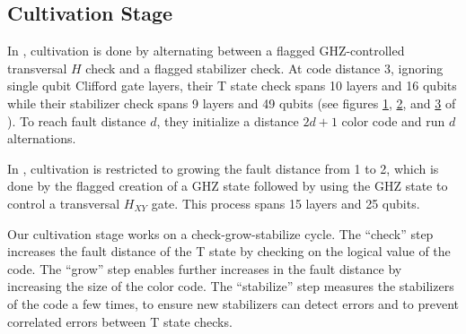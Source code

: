 \documentclass[onecolumn,unpublished,a4paper]{quantumarticle}
\theoremstyle{definition}
\begin{document}
\subsection{Cultivation Stage}

In \cite{chamberland2020colorinjection}, cultivation is done by alternating between a flagged GHZ-controlled transversal $H$ check and a flagged stabilizer check.
At code distance 3, ignoring single qubit Clifford gate layers, their T state check spans 10 layers and 16 qubits while their stabilizer check spans 9 layers and 49 qubits (see figures
\href{
    https://www.nature.com/articles/s41534-020-00319-5/figures/1
}{1},
\href{
    https://www.nature.com/articles/s41534-020-00319-5/figures/2
}{2},
and
\href{
    https://www.nature.com/articles/s41534-020-00319-5/figures/3
}{3}
of \cite{chamberland2020colorinjection}).
To reach fault distance $d$, they initialize a distance $2d+1$ color code and run $d$ alternations.

In \cite{itogawa2024zeroleveldistilldistill}, cultivation is restricted to growing the fault distance from 1 to 2, which is done by the flagged creation of a GHZ state followed by using the GHZ state to control a transversal $H_{XY}$ gate.
This process spans 15 layers and 25 qubits.

Our cultivation stage works on a check-grow-stabilize cycle.
The ``check'' step increases the fault distance of the T state by checking on the logical value of the code.
The ``grow'' step enables further increases in the fault distance by increasing the size of the color code.
The ``stabilize'' step measures the stabilizers of the code a few times, to ensure new stabilizers can detect errors and to prevent correlated errors between T state checks.
\end{document}
